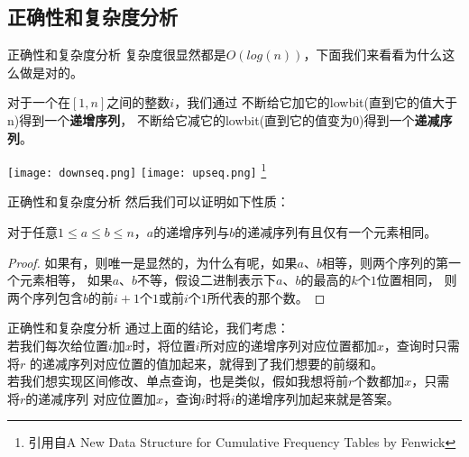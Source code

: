 \documentclass{beamer}
\begin{document}
		\subsection{正确性和复杂度分析}
			\begin{frame}{正确性和复杂度分析}
				复杂度很显然都是$O(log(n))$，下面我们来看看为什么这么做是对的。
				\begin{definition}
					对于一个在$[1,n]$之间的整数$i$，我们通过
					不断给它加它的lowbit(直到它的值大于n)得到一个\textbf{递增序列}，
					不断给它减它的lowbit(直到它的值变为0)得到一个\textbf{递减序列}。
				\end{definition}
				\texttt{[image: downseq.png]}
				\texttt{[image: upseq.png]}
				\footnote{引用自A New Data Structure for Cumulative Frequency Tables by Fenwick} 
			\end{frame}
			\begin{frame}{正确性和复杂度分析}
				然后我们可以证明如下性质：
				\begin{theorem}
					对于任意$1 \leq a \leq b \leq n$，$a$的递增序列与$b$的递减序列有且仅有一个元素相同。 
				\end{theorem}
				\begin{proof}
					如果有，则唯一是显然的，为什么有呢，如果$a$、$b$相等，则两个序列的第一个元素相等，
					如果$a$、$b$不等，假设二进制表示下$a$、$b$的最高的$k$个$1$位置相同，
					则两个序列包含$b$的前$i+1$个$1$或前$i$个$1$所代表的那个数。
				\end{proof}
			\end{frame}
			\begin{frame}{正确性和复杂度分析}
				通过上面的结论，我们考虑：\\
				若我们每次给位置$i$加$x$时，将位置$i$所对应的递增序列对应位置都加$x$，查询时只需将$r$
				的递减序列对应位置的值加起来，就得到了我们想要的前缀和。\\
				若我们想实现区间修改、单点查询，也是类似，假如我想将前$r$个数都加$x$，只需将$r$的递减序列
				对应位置加$x$，查询$i$时将$i$的递增序列加起来就是答案。
			\end{frame}
\end{document}
